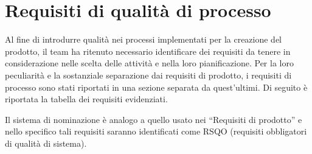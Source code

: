 \newpage
\section{Requisiti di qualità di processo}\label{sec:qualitaProcesso}

Al fine di introdurre qualità nei processi implementati per la creazione del prodotto, il team ha ritenuto necessario identificare dei requisiti da tenere in considerazione nelle scelta delle attività e nella loro pianificazione. Per la loro peculiarità e la sostanziale separazione dai requisiti di prodotto, i requisiti di processo sono stati riportati in una sezione separata da quest'ultimi. Di seguito è riportata la tabella dei requisiti evidenziati.

Il sistema di nominazione è analogo a quello usato nei ``Requisiti di prodotto'' e nello specifico tali requisiti saranno identificati come RSQO (requisiti obbligatori di qualità di sistema).

